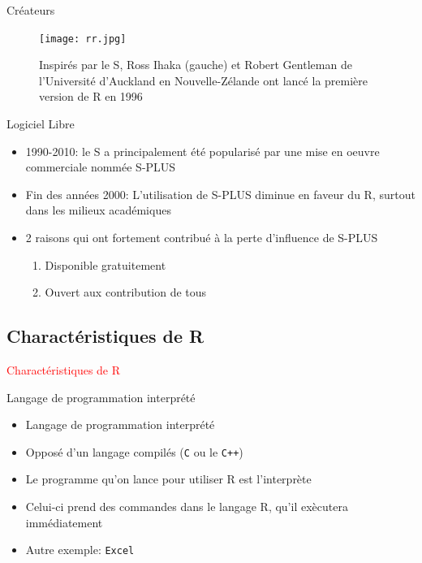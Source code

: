 \documentclass[11pt]{beamer}\usepackage[]{graphicx}\usepackage[]{color}
\newcommand{\code}[1]{\texttt{#1}}
\begin{document}
\begin{frame}{Cr\'{e}ateurs}
\begin{center}
\begin{figure}
\texttt{[image: rr.jpg]}
\caption{Inspir\'{e}s par le S, Ross Ihaka (gauche) et Robert Gentleman de l'Universit\'{e} d'Auckland en Nouvelle-Z\'{e}lande ont lanc\'{e} la premi\`{e}re version de R en 1996}
\end{figure}
\end{center}
\end{frame}


\begin{frame}{Logiciel Libre}
\begin{itemize}
  \setlength\itemsep{2em}
\item 1990-2010: le S a principalement \'{e}t\'{e} popularis\'{e} par une mise en oeuvre commerciale nomm\'{e}e S-PLUS
\pause \item Fin des ann\'{e}es 2000: L'utilisation de S-PLUS diminue en faveur du R, surtout dans les milieux acad\'{e}miques
\pause \item 2 raisons qui ont fortement contribu\'{e} \`{a} la perte d'influence de S-PLUS
\begin{enumerate}
\item \normalsize Disponible gratuitement
\pause \item Ouvert aux contribution de tous
\end{enumerate}
\end{itemize}
\end{frame}



\subsection{Charact\'{e}ristiques de R}

\begin{frame}
 \begin{center}
  \Huge{\textcolor{red}{Charact\'{e}ristiques de R}}
 \end{center}
\end{frame}



\begin{frame}{Langage de programmation interpr\'{e}t\'{e}}
\begin{itemize}
  \setlength\itemsep{2em}
\item Langage de programmation interpr\'{e}t\'{e}
\pause \item Oppos\'{e} d'un langage compil\'{e}s (\code{C} ou le \code{C++})
\pause \item Le programme qu'on lance pour utiliser R est l'interpr\`{e}te
\pause \item Celui-ci prend des commandes dans le langage R, qu'il ex\`{e}cutera imm\'{e}diatement
\pause \item  Autre exemple: \code{Excel}
\end{itemize}
\end{frame}
\end{document}

